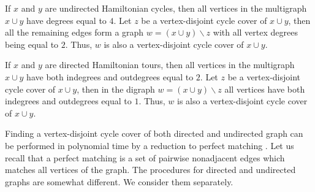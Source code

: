 \documentclass[runningheads]{llncs}
\begin{document}
If $x$ and $y$ are undirected Hamiltonian cycles, then all vertices in the multigraph $x \cup y$ have degrees equal to $4$. Let $z$ be a vertex-disjoint cycle cover of $x \cup y$, then all the remaining edges form a graph $w = (x \cup y) \backslash z$ with all vertex degrees being equal to $2$. Thus, $w$ is also a vertex-disjoint cycle cover of $x \cup y$. %

If $x$ and $y$ are directed Hamiltonian tours, then all vertices in the multigraph $x \cup y$ have both indegrees and outdegrees equal to $2$. Let $z$ be a vertex-disjoint cycle cover of $x \cup y$, then in the digraph $w = (x \cup y) \backslash z$ all vertices have both indegrees and outdegrees equal to $1$. Thus, $w$ is also a vertex-disjoint cycle cover of $x \cup y$. %

Finding a vertex-disjoint cycle cover of both directed and undirected graph can be performed in polynomial time by a reduction to perfect matching \cite{Tutte}.
Let us recall that a perfect matching is a set of pairwise nonadjacent edges which matches all vertices of the graph. %
The procedures for directed and undirected graphs are somewhat different. We consider them separately. %
\end{document}
